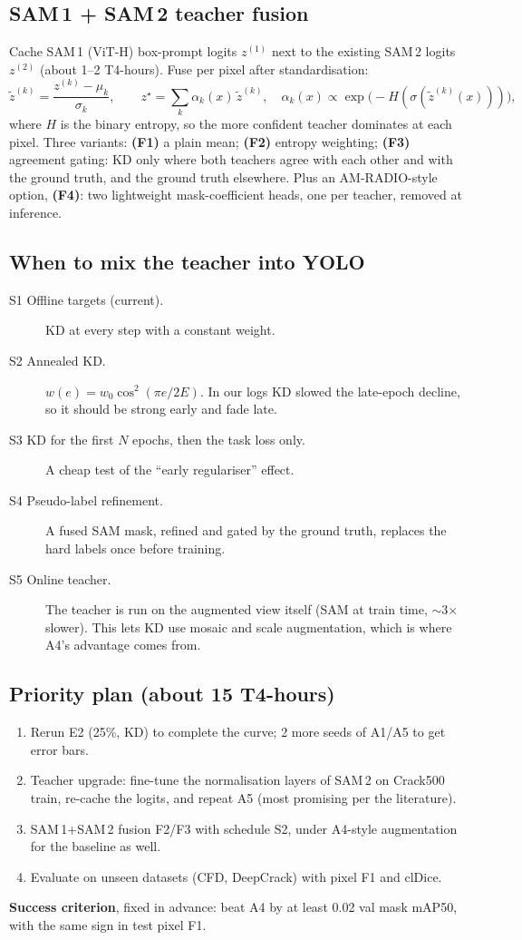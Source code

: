 \documentclass[11pt,a4paper]{article}
\begin{document}
\subsection{SAM\,1 + SAM\,2 teacher fusion}
Cache SAM\,1 (ViT-H) box-prompt logits $z^{(1)}$ next to the existing SAM\,2 logits $z^{(2)}$ (about 1--2 T4-hours). Fuse per pixel after standardisation:
\[
\tilde z^{(k)}=\frac{z^{(k)}-\mu_k}{\sigma_k},\qquad
z^{\star}=\sum_k \alpha_k(x)\,\tilde z^{(k)},\quad
\alpha_k(x)\propto \exp\!\big(-H(\sigma(\tilde z^{(k)}(x)))\big),
\]
where $H$ is the binary entropy, so the more confident teacher dominates at each pixel. Three variants:
\textbf{(F1)} a plain mean;
\textbf{(F2)} entropy weighting;
\textbf{(F3)} agreement gating: KD only where both teachers agree with each other and with the ground truth, and the ground truth elsewhere.
Plus an AM-RADIO-style option, \textbf{(F4)}: two lightweight mask-coefficient heads, one per teacher, removed at inference.

\subsection{When to mix the teacher into YOLO}
\begin{description}
\item[S1 Offline targets (current).] KD at every step with a constant weight.
\item[S2 Annealed KD.] $w(e)=w_0\cos^2(\pi e/2E)$. In our logs KD slowed the late-epoch decline, so it should be strong early and fade late.
\item[S3 KD for the first $N$ epochs, then the task loss only.] A cheap test of the ``early regulariser'' effect.
\item[S4 Pseudo-label refinement.] A fused SAM mask, refined and gated by the ground truth, replaces the hard labels once before training.
\item[S5 Online teacher.] The teacher is run on the augmented view itself (SAM at train time, $\sim$3$\times$ slower). This lets KD use mosaic and scale augmentation, which is where A4's advantage comes from.
\end{description}

\subsection{Priority plan (about 15 T4-hours)}
\begin{enumerate}
\item Rerun E2 (25\%, KD) to complete the curve; 2 more seeds of A1/A5 to get error bars.
\item Teacher upgrade: fine-tune the normalisation layers of SAM\,2 on Crack500 train, re-cache the logits, and repeat A5 (most promising per the literature).
\item SAM\,1+SAM\,2 fusion F2/F3 with schedule S2, under A4-style augmentation for the baseline as well.
\item Evaluate on unseen datasets (CFD, DeepCrack) with pixel F1 and clDice.
\end{enumerate}
\textbf{Success criterion}, fixed in advance: beat A4 by at least 0.02 val mask mAP50, with the same sign in test pixel F1.
\end{document}
